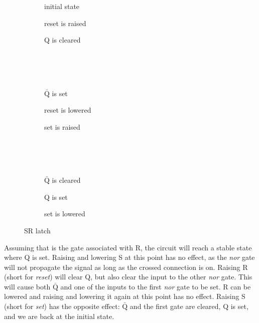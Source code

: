 \begin{figure}[p]
    \centering
    \begin{subfigure}{0.25\textwidth}
        
        \caption{initial state}
    \end{subfigure}
    \begin{subfigure}{0.25\textwidth}
        
        \caption{reset is raised}
    \end{subfigure}
    \begin{subfigure}{0.25\textwidth}
        
        \caption{Q is cleared}
    \end{subfigure}
    \\~\\~\\
    \begin{subfigure}{0.25\textwidth}
        
        \caption{$\bar{\text{Q}}$ is set}
    \end{subfigure}
    \begin{subfigure}{0.25\textwidth}
        
        \caption{reset is lowered}
    \end{subfigure}
    \begin{subfigure}{0.25\textwidth}
        
        \caption{set is raised}
    \end{subfigure}
    \\~\\~\\
    \begin{subfigure}{0.25\textwidth}
        
        \caption{$\bar{\text{Q}}$ is cleared}
    \end{subfigure}
    \begin{subfigure}{0.25\textwidth}
        
        \caption{Q is set}
    \end{subfigure}
    \begin{subfigure}{0.25\textwidth}
        
        \caption{set is lowered}
    \end{subfigure}
    \caption{SR latch}
    \label{fig:arch:sr_latch}
\end{figure}

Assuming that is the gate associated with R, the circuit will reach a stable
state where Q is set.  Raising and lowering S at this point has no effect, as
the \textit{nor} gate will not propagate the signal as long as the crossed
connection is on.  Raising R (short for \textit{reset}) will clear Q, but also
clear the input to the other \textit{nor} gate.  This will cause both
$\bar{\text{Q}}$ and one of the inputs to the first \textit{nor} gate to be set.
R can be lowered and raising and lowering it again at this point has no effect.
Raising S (short for \textit{set}) has the opposite effect: $\bar{\text{Q}}$ and
the first gate are cleared, Q is set, and we are back at the initial state.

